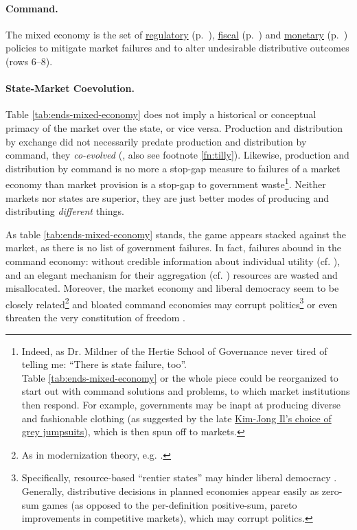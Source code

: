\paragraph[Command]{Command.}  \label{sec:command} The mixed economy is the set of \hyperref[sec:regulatory]{regulatory} (p.~\pageref{sec:regulatory}), \hyperref[sec:fiscal]{fiscal} (p.~\pageref{sec:fiscal}) and \hyperref[sec:monetary]{monetary} (p.~\pageref{sec:monetary}) policies to mitigate market failures and to alter undesirable distributive outcomes (rows 6--8).

\paragraph{State-Market Coevolution.} Table \ref{tab:ends-mixed-economy} does not imply a historical or conceptual primacy of the market over the state, or vice versa. Production and distribution by exchange did not necessarily predate production and distribution by command, they \emph{co-evolved} (\citealt{Tilly-1985-aa}, also see footnote \ref{fn:tilly}). Likewise, production and distribution by command is no more a stop-gap measure to failures of a market economy than market provision is a stop-gap to government waste\footnote
	{Indeed, as Dr. Mildner of the Hertie School of Governance never tired of telling me: ``There is state failure, too''. \\
	Table \ref{tab:ends-mixed-economy} or the whole piece could be reorganized to start out with command solutions and problems, to which market institutions then respond. For example, governments may be inapt at producing diverse and fashionable clothing (as suggested by the late \href{http://kimjongillookingatthings.tumblr.com/}{Kim-Jong Il's choice of grey jumpsuits}), which is then spun off to markets.}. 
Neither markets nor states are superior, they are just better modes of producing and distributing \emph{different} things.

As table \ref{tab:ends-mixed-economy} stands, the game appears stacked against the market, as there is no list of government failures. In fact, failures abound in the command economy: without credible information about individual utility (cf. \citealt{Hayek1931}), and an elegant mechanism for their aggregation (cf. \citealt{Lerner1944, Lange1934, Debreu1954}) resources are wasted and misallocated. Moreover, the market economy and liberal democracy seem to be closely related\footnote{
	As in modernization theory, e.g. \cite{InglehartWelzel-2005-aa}.} 
and bloated command economies may corrupt politics\footnote{
	Specifically, resource-based ``rentier states'' may hinder liberal democracy \citep{Beblawi1990}. Generally, distributive decisions in planned economies appear easily as zero-sum games (as opposed to the per-definition positive-sum, pareto improvements in competitive markets), which may corrupt politics.} 
or even threaten the very constitution of freedom \citep{Hayek1944, Friedman1962}.

